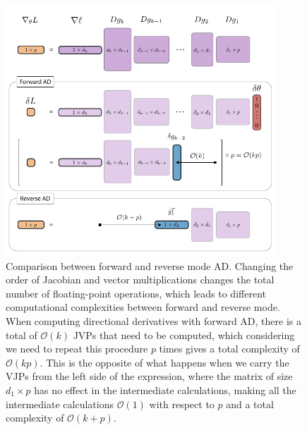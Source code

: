 \begin{figure}[p]
    \centering
    \includegraphics[width=0.90\textwidth]{figures/VJP-AD.pdf}
    \caption{Comparison between forward and reverse mode AD. Changing the order of Jacobian and vector multiplications changes the total number of floating-point operations, which leads to different computational complexities between forward and reverse mode. When computing directional derivatives with forward AD, there is a total of $\mathcal O (k)$ JVPs that need to be computed, which considering we need to repeat this procedure $p$ times gives a total complexity of $\mathcal O (kp)$. This is the opposite of what happens when we carry the VJPs from the left side of the expression, where the matrix of size $d_1 \times p$ has no effect in the intermediate calculations, making all the intermediate calculations $\mathcal O (1)$ with respect to $p$ and a total complexity of $\mathcal O (k + p)$. }
    \label{fig:vjp-jvp}
\end{figure}

